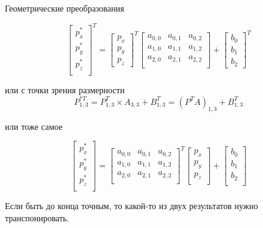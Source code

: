 \documentclass{beamer}
\begin{document}
\begin{frame}{Геометрические преобразования}
{		\[
			\begin{bmatrix}
				p_x^{*} \\
				p_y^{*} \\
				p_z^{*} \\
			\end{bmatrix}^T
			=
			\begin{bmatrix}
				p_x \\
				p_y \\
				p_z
			\end{bmatrix}^T
			\begin{bmatrix}
				a_{0,0} & a_{0,1} & a_{0,2}  \\
				a_{1,0} & a_{1,1} & a_{1,2}  \\
				a_{2,0} & a_{2,1} & a_{2,2}  \\
			\end{bmatrix}
			+
			\begin{bmatrix}
				b_0 \\
				b_1 \\
				b_2
			\end{bmatrix}^T
		\]

		или с точки зрения размерности
		\[
			P^{*T}_{1,3}
			=P^T_{1,3} \times A_{3,3}+B^T_{1,3} 
			=(P^TA)_{1,3}+B_{1,3}^T 
			\]

		или тоже самое

		\[
			\begin{bmatrix}
				p_x^{*} \\
				p_y^{*} \\
				p_z^{*} \\
			\end{bmatrix}
			=
			\begin{bmatrix}
				a_{0,0} & a_{0,1} & a_{0,2}  \\
				a_{1,0} & a_{1,1} & a_{1,2}  \\
				a_{2,0} & a_{2,1} & a_{2,2}  \\
			\end{bmatrix}^T
			\begin{bmatrix}
				p_x \\
				p_y \\
				p_z \\
			\end{bmatrix}
			+
			\begin{bmatrix}
				b_0 \\
				b_1 \\
				b_2 \\
			\end{bmatrix}
		\]

		Если быть до конца точным, то какой-то из двух результатов нужно транспонировать.
		}
	\end{frame}
\end{document}
